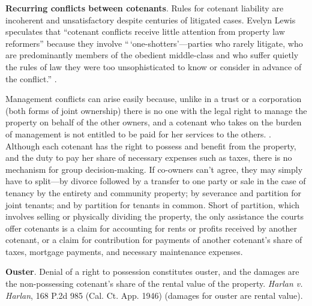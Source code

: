 

\item \textbf{Recurring conflicts between cotenants}. Rules for cotenant
liability are incoherent and unsatisfactory despite centuries of litigated
cases. Evelyn Lewis speculates that ``cotenant conflicts receive little
attention from property law reformers'' because they involve
``\,`one-shotters'---parties who rarely litigate, who are predominantly members
of the obedient middle-class and who suffer quietly the rules of law they were
too unsophisticated to know or consider in advance of the conflict.''
.


Management conflicts can arise easily because, unlike in a trust or a
corporation (both forms of joint ownership) there is no one with the legal
right to manage the property on behalf of the other owners, and a cotenant who
takes on the burden of management is not entitled to be paid for her services
to the others. . Although each cotenant has the
right to possess and benefit from the
property, and the duty to pay her share of necessary expenses such as taxes,
there is no mechanism for group decision-making. If co-owners can't agree, they
may simply have to split---by divorce followed by a transfer to one party or
sale in the case of tenancy by the entirety and community property; by severance
and partition for joint tenants; and by partition for tenants in common. Short
of partition, which involves selling or physically dividing the property, the
only assistance the courts offer cotenants is a claim for accounting for rents
or profits received by another cotenant, or a claim for contribution for
payments of another cotenant's share of taxes, mortgage payments, and necessary
maintenance expenses.



\item \textbf{Ouster}. Denial of a right to possession constitutes ouster, and
the damages are the non-possessing cotenant's share of the rental value of the
property. \emph{Harlan v. Harlan}, 168 P.2d 985 (Cal. Ct. App. 1946) (damages
for ouster are rental value).


